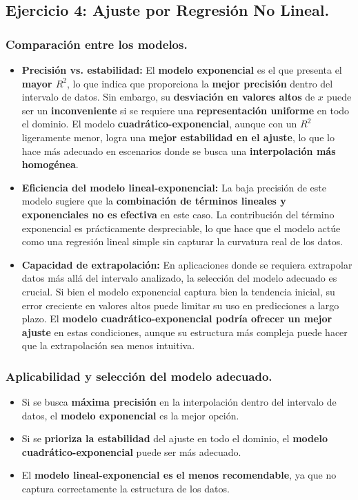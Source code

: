\documentclass{article}
\begin{document}
\subsection{Ejercicio 4: Ajuste por Regresión No Lineal.}
\label{subsec:dnoregresion}
\subsubsection*{Comparación entre los modelos.}
\begin{itemize}
    \item \textbf{Precisión vs. estabilidad:} El \textbf{modelo exponencial} es el que presenta el \textbf{mayor $R^2$}, lo que indica que proporciona la \textbf{mejor precisión} dentro del intervalo de datos. Sin embargo, su \textbf{desviación en valores altos} de $x$ puede ser un \textbf{inconveniente} si se requiere una \textbf{representación uniforme} en todo el dominio. El modelo \textbf{cuadrático-exponencial}, aunque con un $R^2$ ligeramente menor, logra una \textbf{mejor estabilidad en el ajuste}, lo que lo hace más adecuado en escenarios donde se busca una \textbf{interpolación más homogénea}.
    
    \item \textbf{Eficiencia del modelo lineal-exponencial:} La baja precisión de este modelo sugiere que la \textbf{combinación de términos lineales y exponenciales no es efectiva} en este caso. La contribución del término exponencial es prácticamente despreciable, lo que hace que el modelo actúe como una regresión lineal simple sin capturar la curvatura real de los datos.

    \item \textbf{Capacidad de extrapolación:} En aplicaciones donde se requiera extrapolar datos más allá del intervalo analizado, la selección del modelo adecuado es crucial. Si bien el modelo exponencial captura bien la tendencia inicial, su error creciente en valores altos puede limitar su uso en predicciones a largo plazo. El \textbf{modelo cuadrático-exponencial podría ofrecer un mejor ajuste} en estas condiciones, aunque su estructura más compleja puede hacer que la extrapolación sea menos intuitiva.
\end{itemize}

\subsubsection*{Aplicabilidad y selección del modelo adecuado.}
\begin{itemize}
    \item Si se busca \textbf{máxima precisión} en la interpolación dentro del intervalo de datos, el \textbf{modelo exponencial} es la mejor opción.
    \item Si se \textbf{prioriza la estabilidad} del ajuste en todo el dominio, el \textbf{modelo cuadrático-exponencial} puede ser más adecuado.
    \item El \textbf{modelo lineal-exponencial es el menos recomendable}, ya que no captura correctamente la estructura de los datos.
\end{itemize}
\end{document}
